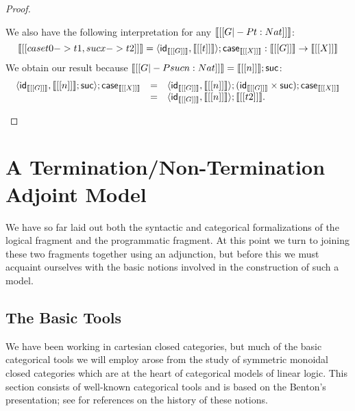 \begin{proof}
\begin{itemize}
    We also have the following interpretation for any $\llbracket [[G |-P t : Nat]] \rrbracket$:
    \[
    \llbracket [[case t {0 -> t1, suc x -> t2}]] \rrbracket =
    \langle \mathsf{id}_{\llbracket [[G]] \rrbracket}, \llbracket [[t]] \rrbracket \rangle;\mathsf{case}_{\llbracket [[X]] \rrbracket} : \llbracket [[G]] \rrbracket \rightarrow \llbracket [[X]] \rrbracket
    \]
    We obtain our result because $\llbracket [[G |-P suc n : Nat]] \rrbracket = \llbracket [[n]] \rrbracket;\mathsf{suc}$:
    \[
    \begin{array}{lll}
      \langle \mathsf{id}_{\llbracket [[G]] \rrbracket}, \llbracket [[n]] \rrbracket;\mathsf{suc} \rangle;\mathsf{case}_{\llbracket [[X]] \rrbracket}
      &  = & \langle \mathsf{id}_{\llbracket [[G]] \rrbracket}, \llbracket [[n]] \rrbracket \rangle;(\mathsf{id}_{\llbracket [[G]] \rrbracket} \times \mathsf{suc});\mathsf{case}_{\llbracket [[X]] \rrbracket}\\
      &  = & \langle \mathsf{id}_{\llbracket [[G]] \rrbracket}, \llbracket [[n]] \rrbracket \rangle;\llbracket [[t2]] \rrbracket.
    \end{array}
    \]
  \end{itemize}
\end{proof}

\section{A Termination/Non-Termination Adjoint Model}
\label{sec:a_termination/non-termination_adjoint_model}
We have so far laid out both the syntactic and categorical
formalizations of the logical fragment and the programmatic fragment.
At this point we turn to joining these two fragments together using an
adjunction, but before this we must acquaint ourselves with the basic
notions involved in the construction of such a model.

\subsection{The Basic Tools}
\label{subsec:the_basic_tools}
We have been working in cartesian closed categories, but much of the
basic categorical tools we will employ arose from the study of
symmetric monoidal closed categories which are at the heart of
categorical models of linear logic.  This section consists of
well-known categorical tools and is based on the Benton's
presentation; see \cite{?} for references on the history of these
notions.

